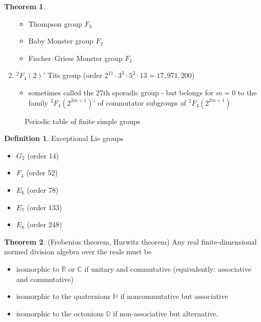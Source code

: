\documentclass[10pt,a4paper]{book}
\theoremstyle{definition}
\newtheorem{definition}{Definition}[section]
\newtheorem{theorem}{Theorem}[section]
\begin{document}
\begin{theorem}
\begin{enumerate}
\begin{itemize}
        \item Thompson group $F_3$
        \item Baby Monster group $F_2$
        \item Fischer–Griess Monster group $F_1$
    \end{itemize}
    \item $^2F_4(2)'$ Tits group (order $2^11\cdot3^3\cdot5^2\cdot13=17,971,200$)
    \begin{itemize}
        \item sometimes called the 27th sporadic group - but belongs for $m=0$ to the family $^2F_4(2^{2m+1})'$ of commutator subgroups of $^2F_4(2^{2m+1})$
    \end{itemize}
\end{enumerate}
\end{theorem}

\begin{figure}[htp]
    \centering
    \caption{Periodic table of finite simple groups }
    \label{fig:galaxy}
\end{figure}

\begin{definition}{}
Exceptional Lie groups 
\begin{itemize}
    \item $G_2$ (order 14)
    \item $F_4$ (order 52)
    \item $E_6$ (order 78)
    \item $E_7$ (order 133)
    \item $E_8$ (order 248)
\end{itemize}
\end{definition}

\begin{theorem}
(Frobenius theorem, Hurwitz theorem) Any real finite-dimensional normed division algebra over the reals must be
\begin{itemize}
    \item isomorphic to $\mathbb{R}$ or $\mathbb{C}$ if unitary and commutative (equivalently: associative and commutative)
    \item isomorphic to the quaternions $\mathbb{H}$ if noncommutative but associative
    \item isomorphic to the octonions $\mathbb{O}$ if non-associative but alternative.
\end{itemize}
\end{theorem}
\end{document}
